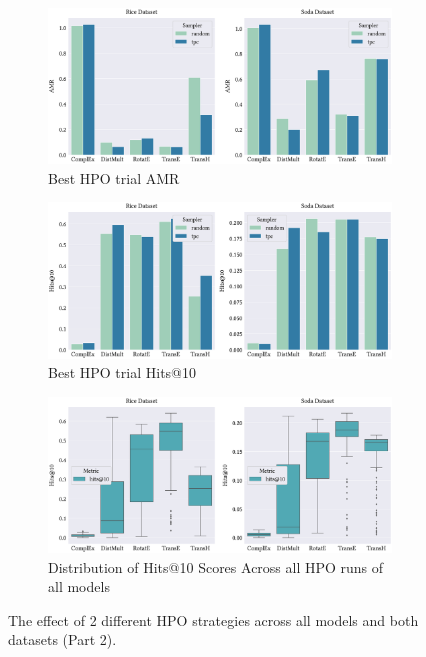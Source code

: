 \begin{figure}[!ht]
    \centering
    \begin{subfigure}[b]{\textwidth}
        \centering
        \includegraphics[width=1\textwidth]{figures/hpo_best_trial_AMR.eps}
        \caption{Best \ac{HPO} trial \ac{AMR}}
        \label{subfig:hpo_best_trial_AMR}
    \end{subfigure}
    
    \begin{subfigure}[b]{\textwidth}
        \centering
        \includegraphics[width=1\textwidth]{figures/hpo_best_trial_hits@10.eps}
        \caption{Best \ac{HPO} trial Hits@10}
        \label{subfig:hpo_best_trial_hits@10}
    \end{subfigure}
    
    \begin{subfigure}[b]{\textwidth}
        \centering
        \includegraphics[width=1\textwidth]{figures/hpo_summary_overall_hits@10.eps}
        \caption{Distribution of Hits@10 Scores Across all HPO runs of all models}
        \label{subfig:hpo_summary}
    \end{subfigure}
    
    \caption{The effect of 2 different \ac{HPO} strategies across all models and both datasets (Part 2).}
    \label{fig:effect_of_2_different_HPO_strategies_part2}
\end{figure}

